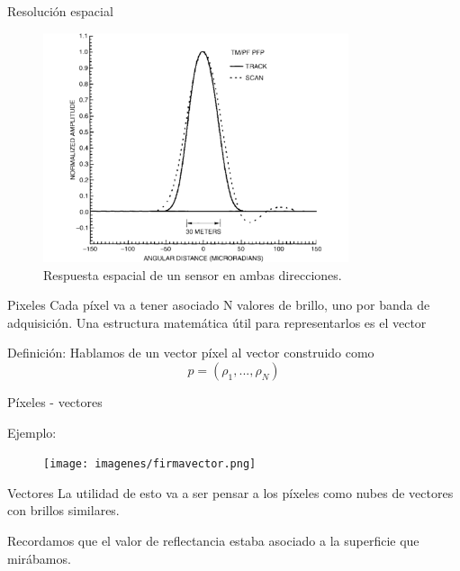\documentclass[]{beamer}
\begin{document}
\begin{frame}{Resolución espacial}
  \begin{figure}
  \centering
  \includegraphics[width=0.8\textwidth]{imagenes/respacial.png}
  \caption{Respuesta espacial de un sensor en ambas direcciones.}
  \end{figure}
\end{frame}

\begin{frame}{Pixeles}
  Cada píxel va a tener asociado N valores de brillo, uno por banda de adquisición. Una estructura matemática útil para representarlos es el vector
  \begin{block}{Definición:}
    Hablamos de un vector píxel al vector construido como
    \begin{equation}
      p = (\rho_1, ... ,\rho_N)
    \end{equation}
  \end{block}
\end{frame}

\begin{frame}{Píxeles - vectores}
  \begin{exampleblock}{Ejemplo:}
    \begin{figure}
      \texttt{[image: imagenes/firmavector.png]}
    \end{figure}
  \end{exampleblock}
\end{frame}

\begin{frame}{Vectores}
  La utilidad de esto va a ser pensar a los píxeles como nubes de vectores con brillos similares.

  Recordamos que el valor de reflectancia estaba asociado a la superficie que mirábamos.
\end{frame}
\end{document}
